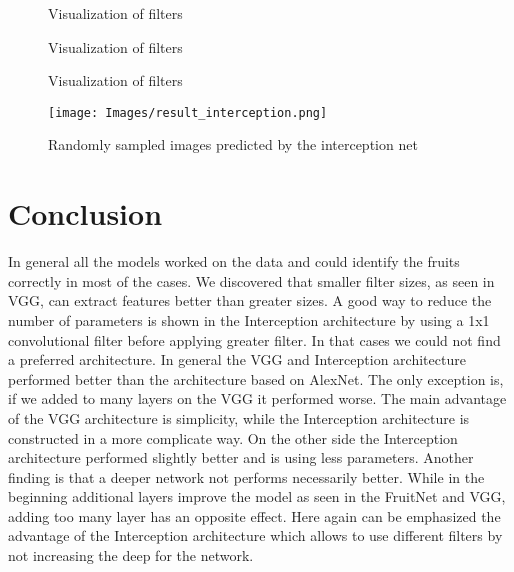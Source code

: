 \documentclass[11pt, a4paper]{article}
\begin{document}
\begin{figure}
\centering
    \hfill
    \caption{Visualization of filters}
    \label{fig:filter_all2}
\end{figure}

\begin{figure}
\centering
    \hfill
    \caption{Visualization of filters}
    \label{fig:filter_all3}
\end{figure}

\begin{figure}
\centering
    \hfill
    \caption{Visualization of filters}
    \label{fig:filter_all4}
\end{figure}


\begin{figure}
\centering
\texttt{[image: Images/result\_interception.png]} 
\caption{Randomly sampled images predicted by the interception net}
\label{fig: r_plot}
\end{figure}

\clearpage
\section{Conclusion}

In general all the models worked on the data and could identify the fruits correctly in most of the cases. We discovered that smaller filter sizes, as seen in VGG, can extract features better than greater sizes. A good way to reduce the number of parameters is shown in the Interception architecture by using a 1x1 convolutional filter before applying greater filter. In that cases we could not find a preferred architecture. In general the VGG and Interception architecture performed better than the architecture based on AlexNet. The only exception is, if we added to many layers on the VGG it performed worse. The main advantage of the VGG architecture is simplicity, while the Interception architecture is constructed in a more complicate way. On the other side the Interception architecture performed slightly better and is using less parameters. Another finding is that a deeper network not performs necessarily better. While in the beginning additional layers improve the model as seen in the FruitNet and VGG, adding too many layer has an opposite effect. Here again can be emphasized the advantage of the Interception architecture which allows to use different filters by not increasing the deep for the network.
\end{document}
